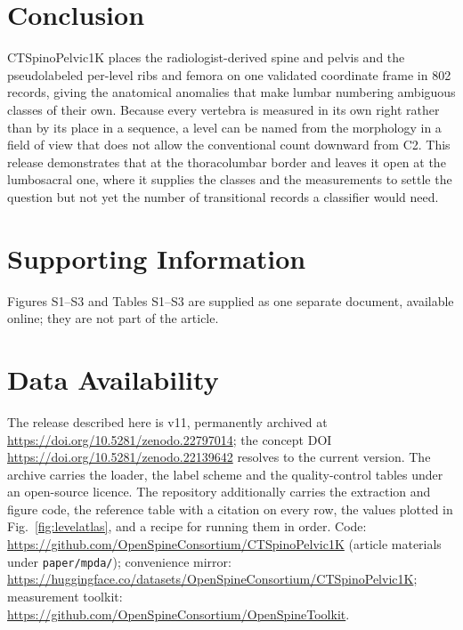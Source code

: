 \documentclass[aapm,mph,amsmath,amssymb,reprint]{revtex4-2}
\newcommand{\datasetdoi}{10.5281/zenodo.22139642}
\newcommand{\datasetversiondoi}{10.5281/zenodo.22797014}
\newcommand{\datasetversion}{v11}
\newif\ifreview \reviewfalse
\newcommand{\doiurl}[1]{\url{https://doi.org/#1}}
\begin{document}
\section{Conclusion}

CTSpinoPelvic1K places the radiologist-derived spine and pelvis and the pseudolabeled per-level
ribs and femora on one validated coordinate frame in 802 records, giving the anatomical
anomalies that make lumbar numbering ambiguous classes of their own.
Because every vertebra is measured in its own right rather than by its place in a sequence, a
level can be named from the morphology in a field of view that does not allow the
conventional count downward from C2. This release demonstrates that at the thoracolumbar
border and leaves it open at the lumbosacral one, where it supplies the classes and the
measurements to settle the question but not yet the number of transitional records a
classifier would need. 

\section*{Supporting Information}
Figures S1--S3 and Tables S1--S3 are supplied as one separate document, available online;
they are not part of the article.

\section*{Data Availability}
The release described here is \datasetversion{}, permanently archived at
\doiurl{\datasetversiondoi}; the concept DOI \doiurl{\datasetdoi} resolves to the
current version.
The archive carries the loader, the label scheme and the quality-control tables under an
open-source licence. The repository additionally carries the extraction and figure code,
the reference table with a citation on every row, the values plotted in
Fig.~\ref{fig:levelatlas}, and a recipe for running them in order. \ifreview The
repository URL identifies the authors; it is on the title page and will be restored here for
the camera-ready version.\else Code:
\url{https://github.com/OpenSpineConsortium/CTSpinoPelvic1K} (article materials under
\texttt{paper/mpda/}); convenience mirror:
\url{https://huggingface.co/datasets/OpenSpineConsortium/CTSpinoPelvic1K}; measurement
toolkit: \url{https://github.com/OpenSpineConsortium/OpenSpineToolkit}.\fi
\end{document}

